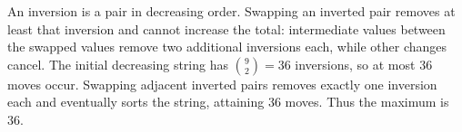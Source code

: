An inversion is a pair in decreasing order. Swapping an inverted pair removes at least that inversion and cannot increase the total: intermediate values between the swapped values remove two additional inversions each, while other changes cancel. The initial decreasing string has $\binom92=36 $ inversions, so at most 36 moves occur. Swapping adjacent inverted pairs removes exactly one inversion each and eventually sorts the string, attaining 36 moves. Thus the maximum is $\boxed{36}$.
